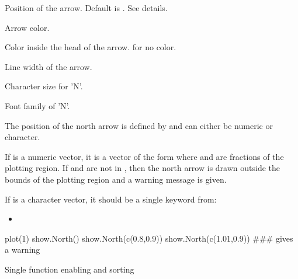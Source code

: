\documentclass[a4paper]{book}
\begin{document}
%
\begin{Arguments}
\begin{ldescription}
\item[\code{pos}] Position of the arrow. Default is . See details.

\item[\code{arrow.col}] Arrow color.

\item[\code{arrow.fill}] Color inside the head of the arrow.  for no color.

\item[\code{arrow.lwd}] Line width of the arrow.

\item[\code{N.cex}] Character size for 'N'.

\item[\code{N.family}] Font family of 'N'.


\end{ldescription}
\end{Arguments}
%
\begin{Details}\relax
The position of the north arrow is defined by  and can either be numeric or character.

If  is a numeric vector, it is a vector of the form  where  and  are fractions of the plotting region. 
If  and  are not in \eqn{[0, 1]}{}, then the north arrow is drawn outside the bounds of the plotting region 
and a warning message is given.\\{}

If  is a character vector, it should be a single keyword from:
\begin{itemize}

\item {}

\end{itemize}
 

\end{Details}
%
\begin{Examples}
\begin{ExampleCode}
plot(1)
show.North()
show.North(c(0.8,0.9))
show.North(c(1.01,0.9))  ### gives a warning
\end{ExampleCode}
\end{Examples}
\newpage
{}
%
\begin{Description}\relax
Single function enabling  and  sorting
\end{Description}
\end{document}
